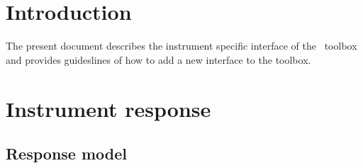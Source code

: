 \documentclass{article}[12pt,a4]
\begin{document}
\frontpage


\section{Introduction}

The present document describes the instrument specific interface of the \this\ toolbox
and provides guideslines of how to add a new interface to the toolbox.


\section{Instrument response}

\subsection{Response model}
\end{document}

